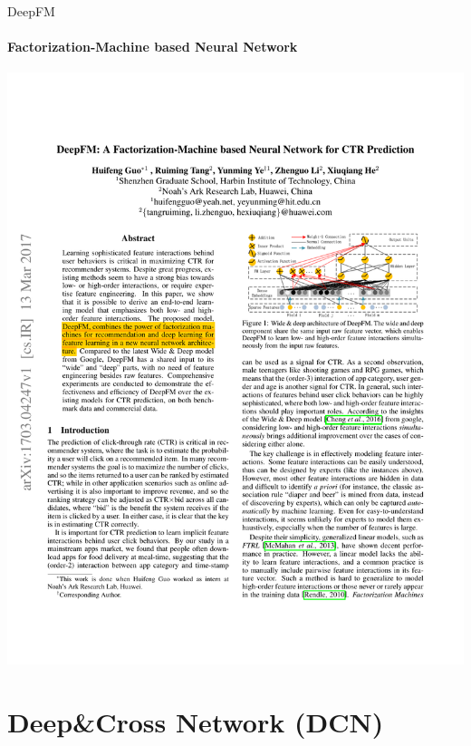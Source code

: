 \documentclass{ctexbeamer}
\begin{document}
\begin{frame}{DeepFM}
	\framesubtitle{Factorization-Machine based Neural Network }
	\begin{center}
		\includegraphics[width=\textwidth]{framework/deepfm}
	\end{center}
\end{frame}

\section{Deep\&Cross Network (DCN)}
\end{document}
